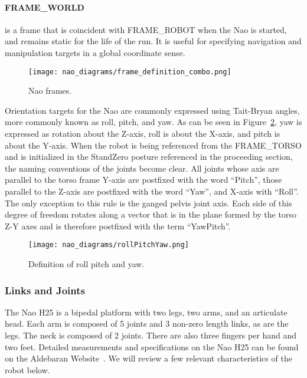 \paragraph{FRAME\_WORLD}
is a frame that is coincident with FRAME\_ROBOT when the Nao is started,
and remains static for the life of the run. It is useful for specifying navigation
and manipulation targets in a global coordinate sense.

\begin{figure}[H]
\centering
\texttt{[image: nao\_diagrams/frame\_definition\_combo.png]}
\caption{Nao frames.}
\label{fig:nao_frames1}
\end{figure}

Orientation targets for the Nao are commonly expressed using Tait-Bryan angles,
more commonly known as roll, pitch, and yaw. As can be seen in
Figure~\ref{fig:nao_rpy_def1}, yaw is expressed as rotation about the Z-axis,
roll is about the X-axis, and pitch is about the Y-axis.
When the robot is being referenced from the FRAME\_TORSO and is
initialized in the StandZero posture referenced in the proceeding section,
the naming conventions of the joints become clear. All joints whose axis
are parallel to the torso frame Y-axis are postfixed with the word ``Pitch'',
those parallel to the Z-axis are postfixed with the word ``Yaw'', and X-axis
with ``Roll''. The only exception to this rule is the ganged pelvis joint
axis. Each side of this degree of freedom rotates along a vector that is
in the plane formed by the torso Z-Y axes and is therefore postfixed with the
term ``YawPitch''.

\begin{figure}
\centerline{\texttt{[image: nao\_diagrams/rollPitchYaw.png]}
}
\caption{Definition of roll pitch and yaw.}
\label{fig:nao_rpy_def1}
\end{figure}


\subsubsection{Links and Joints}
The Nao H25 is a bipedal platform with two legs, two arms, and an articulate
head. Each arm is composed of 5 joints and 3 non-zero length links, as are 
the legs. The neck is composed of 2 joints. 
There are also three fingers per hand and two feet. 
Detailed measurements and specifications on the
Nao H25 can be found on the Aldebaran Website~\cite{nao_docs_h25}.
We will review a few relevant characteristics of the robot below.

